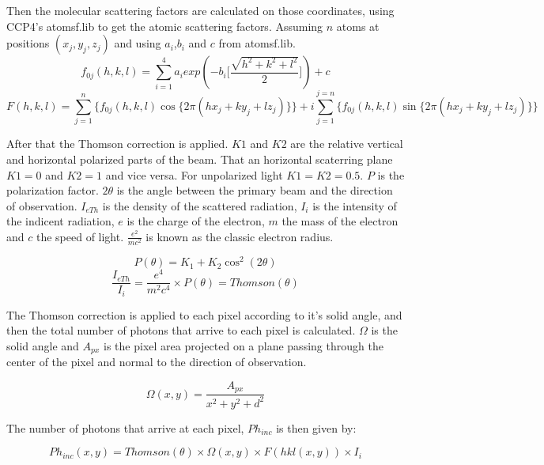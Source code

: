 \documentclass{report}
\begin{document}
Then the molecular scattering factors are calculated on those coordinates, using CCP4's atomsf.lib to get the atomic scattering factors.
Assuming $n$ atoms at positions $(x_j,y_j,z_j)$ and using $a_i$,$b_i$ and $c$ from atomsf.lib.
\begin{equation}
  f_{0j}(h,k,l) = \sum_{i=1}^{4} a_i exp(-b_i\Biggl[\frac{\sqrt{h^2+k^2+l^2}}{2}\Biggl]) + c
\end{equation}
\begin{equation}
  F(h,k,l) = \sum_{j=1}^{n} \{f_{0j}(h,k,l) \cos\{2 \pi (h x_j+k y_j + l z_j)\}\} + i \sum_{j=1}^{j=n}\{f_{0j}(h,k,l) \sin\{2 \pi (h x_j+k y_j + l z_j)\}\}
\end{equation}

After that the Thomson correction is applied. $K1$ and $K2$ are the relative vertical and horizontal polarized parts of the beam.
That an horizontal scaterring plane $K1 = 0$ and $K2 = 1$ and vice versa. For unpolarized light $K1 = K2 = 0.5$.
$P$ is the polarization factor. $2\theta$ is the angle between the primary beam and the direction of observation.
$I_{eTh}$ is the density of the scattered radiation, $I_i$ is the intensity of the indicent radiation,
$e$ is the charge of the electron, $m$ the mass of the electron and $c$ the speed of light.
$\frac{e^2}{mc^2}$ is known as the classic electron radius.


\begin{equation}
   P(\theta) = K_1 +K_2 \cos^2(2\theta)
\end{equation}
\begin{equation}
   \frac{I_{eTh}}{I_i} = \frac{e^4}{m^2c^4} \times P(\theta) = Thomson(\theta)
\end{equation}

The Thomson correction is applied to each pixel according to it's solid angle, and then the total number of photons that arrive to each pixel is calculated.
$\Omega$ is the solid angle and $A_{px}$ is the pixel area projected on a plane passing through the center of the pixel and normal to the direction of observation.


\begin{equation}
   \Omega(x,y) = \frac{A_{px}}{x^2+y^2+d^2}
\end{equation}

The number of photons that arrive at each pixel, $Ph_{inc}$ is then given by:


\begin{equation}
   Ph_{inc}(x,y) = Thomson(\theta) \times \Omega(x,y) \times F(hkl(x,y)) \times I_i
\end{equation}
\end{document}
